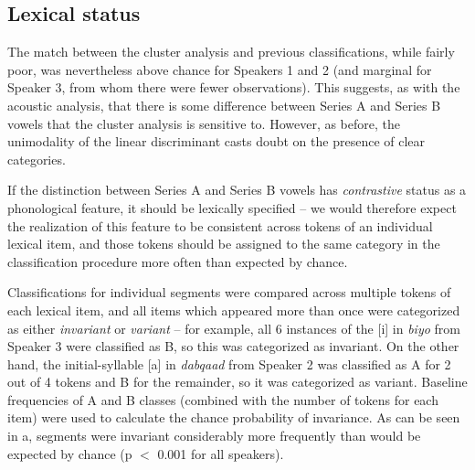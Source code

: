 \documentclass[output=paper,newtxmath,modfonts,nonflat,hidelinks]{langsci/langscibook}
\begin{document}
\subsection{Lexical status}
\label{lex}

The match between the cluster analysis and previous classifications, while fairly poor, was nevertheless above chance for Speakers 1 and 2 (and marginal for Speaker 3, from whom there were fewer observations).  This suggests, as with the acoustic analysis, that there is some difference between Series A and Series B vowels that the cluster analysis is sensitive to.  However, as before, the unimodality of the linear discriminant casts doubt on the presence of clear categories.

If the distinction between Series A and Series B vowels has \textit{contrastive} status as a phonological feature, it should be lexically specified -- we would therefore expect the realization of this feature to be consistent across tokens of an individual lexical item, and those tokens should be assigned to the same category in the classification procedure more often than expected by chance.

Classifications for individual segments were compared across multiple tokens of each lexical item, and all items which appeared more than once were categorized as either \emph{invariant} or \emph{variant} -- for example, all 6 instances of the [i] in \emph{biyo} from Speaker 3 were classified as B, so this was categorized as invariant.  On the other hand, the initial-syllable [a] in \emph{dabqaad} from Speaker 2 was classified as A for 2 out of 4 tokens and B for the remainder, so it was categorized as variant.  Baseline frequencies of A and B classes (combined with the number of tokens for each item) were used to calculate the chance probability of invariance.  As can be seen in a, segments were invariant considerably more frequently than would  be expected by chance (p $<$ 0.001 for all speakers).
\end{document}
